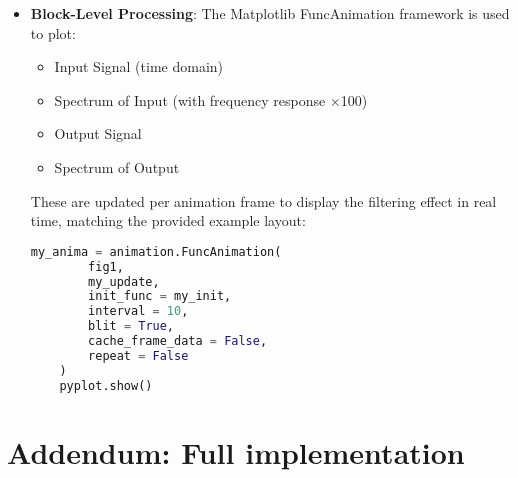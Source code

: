 \documentclass[11pt]{article}
\begin{document}
\begin{itemize}
    
    \item \textbf{Block-Level Processing}: The Matplotlib FuncAnimation framework is used to plot:

    \begin{itemize}
        \item Input Signal (time domain)
        \item Spectrum of Input (with frequency response ×100)
        \item Output Signal
        \item Spectrum of Output
    \end{itemize}

    These are updated per animation frame to display the filtering effect in real time, matching the provided example layout:
    
    \begin{lstlisting}[language=python, label={lst:code}, breaklines=true, caption={Recursive Block-Level Filter Application}]
    my_anima = animation.FuncAnimation(
        fig1,
        my_update,
        init_func = my_init,
        interval = 10,
        blit = True,
        cache_frame_data = False,
        repeat = False
    )
    pyplot.show()
    \end{lstlisting}    
\end{itemize}
\pagebreak
\section*{Addendum: Full implementation}
\end{document}
